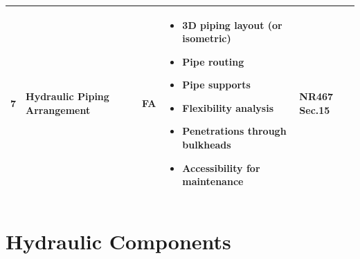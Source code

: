 \documentclass[11pt,a4paper]{report}
\newcommand{\fa}{\textbf{\textcolor{warningred}{FA}}}
\begin{document}
\begin{longtable}{|p{0.5cm}|p{5cm}|p{1.5cm}|p{5.5cm}|p{2cm}|}
7 & Hydraulic Piping Arrangement & \fa{} & 
\begin{itemize}[leftmargin=*,nosep]
\item 3D piping layout (or isometric)
\item Pipe routing
\item Pipe supports
\item Flexibility analysis
\item Penetrations through bulkheads
\item Accessibility for maintenance
\end{itemize} & NR467 Sec.15 \\
\hline

\end{longtable}

\section{Hydraulic Components}
\end{document}
